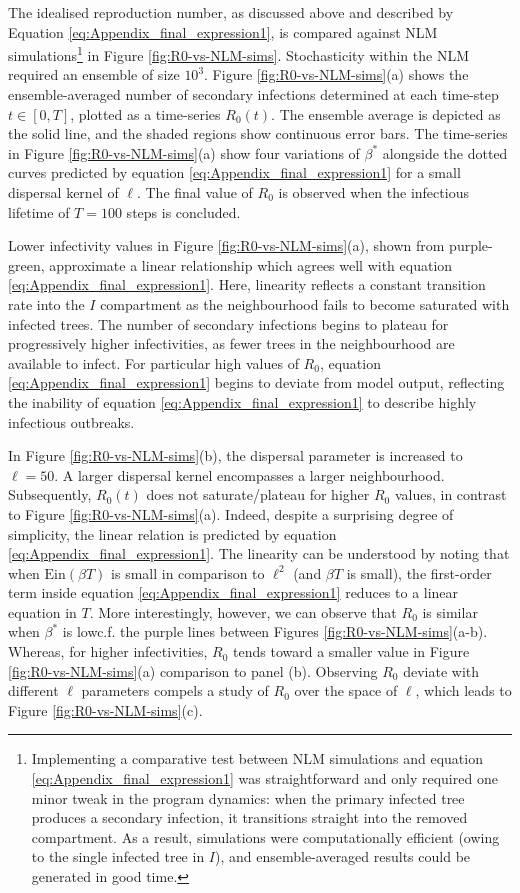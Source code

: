 The idealised reproduction number, as discussed above and described by Equation \ref{eq:Appendix_final_expression1}, is compared against NLM simulations\footnote{Implementing a comparative test between NLM simulations and equation \ref{eq:Appendix_final_expression1} was straightforward and only required one minor tweak in the program dynamics: when the primary infected tree produces a secondary infection, it transitions straight into the removed compartment. As a result, simulations were computationally efficient (owing to the single infected tree in $I$), and ensemble-averaged results could be generated in good time.} in Figure \ref{fig:R0-vs-NLM-sims}.
Stochasticity within the NLM required an ensemble of size $10^3$.
Figure \ref{fig:R0-vs-NLM-sims}(a) shows the ensemble-averaged number of secondary infections determined at each time-step $t\in [0, T]$, plotted as a time-series $R_0(t)$.
The ensemble average is depicted as the solid line, and the shaded regions show continuous error bars.
The time-series in Figure \ref{fig:R0-vs-NLM-sims}(a) show four variations of $\beta^*$ alongside the dotted curves predicted by equation \ref{eq:Appendix_final_expression1} for a small dispersal kernel of $\ell$. 
The final value of $R_0$ is observed when the infectious lifetime of $T=100$ steps is concluded. 

Lower infectivity values in Figure \ref{fig:R0-vs-NLM-sims}(a), shown from purple-green, approximate a linear relationship which agrees well with equation \ref{eq:Appendix_final_expression1}.
Here, linearity reflects a constant transition rate into the $I$ compartment as the neighbourhood fails to become saturated with infected trees. 
The number of secondary infections begins to plateau for progressively higher infectivities, as fewer trees in the neighbourhood are available to infect.
For particular high values of $R_0$, equation \ref{eq:Appendix_final_expression1} begins to deviate from model output, reflecting the inability of equation \ref{eq:Appendix_final_expression1}
to describe highly infectious outbreaks.

In Figure \ref{fig:R0-vs-NLM-sims}(b), the dispersal parameter is increased to $\ell=50$.
A larger dispersal kernel encompasses a larger neighbourhood.
Subsequently, $R_0(t)$ does not saturate/plateau for higher $R_0$ values, in contrast to Figure \ref{fig:R0-vs-NLM-sims}(a).
Indeed, despite a surprising degree of simplicity, the linear relation is predicted by equation \ref{eq:Appendix_final_expression1}.
The linearity can be understood by noting that when $\mathrm{Ein}(\beta T)$ is small in comparison to $\ell^2$ (and $\beta T$ is small), the first-order term inside equation \ref{eq:Appendix_final_expression1} reduces to a linear equation in $T$.
More interestingly, however, we can observe that $R_0$ is similar when $\beta^*$ is low\textemdash c.f. the purple lines between Figures \ref{fig:R0-vs-NLM-sims}(a-b).
Whereas, for higher infectivities, $R_0$ tends toward a smaller value in Figure \ref{fig:R0-vs-NLM-sims}(a) comparison to panel (b).
Observing $R_0$ deviate with different $\ell$ parameters compels a study of $R_0$ over the space of $\ell$, which leads to Figure \ref{fig:R0-vs-NLM-sims}(c).

